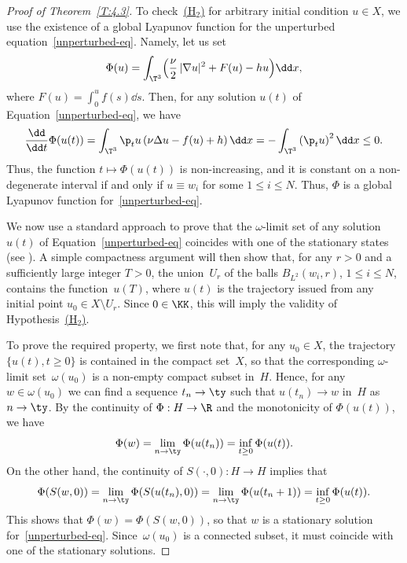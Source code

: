 \begin{proof}[Proof of Theorem~\ref{T:4.3}]
To check~\hyperlink{H2}{(H$_2$)} for arbitrary initial condition $u\in X$, we use the existence of a global Lyapunov function for the unperturbed equation~\eqref{unperturbed-eq}. Namely, let us set
\begin{equation}\label{E:4.5}
\Phi(u)=\int_{\T^3} \Bigl(\frac\nu2\,|\nabla u|^2+F(u)-hu\Bigr)\dd x,
\end{equation}
where $F(u)=\int_0^uf(s)\dd s$. Then, for any solution $u(t)$ of Equation~\eqref{unperturbed-eq}, we have
\[
\frac{\dd}{\dd t} \Phi(u(t))=\int_{\T^3} \p_tu\left(\nu \Delta u- f(u)+h \right)\dd x=-\int_{\T^3} \left(\p_tu\right)^2\dd x\le 0.
\]
Thus, the function $t\mapsto \Phi(u(t))$ is non-increasing, and it is constant on a non-degenerate interval if and only if $u\equiv w_i$ for some $1\le i\le N$. Thus, $\varPhi$ is a global Lyapunov function for~\eqref{unperturbed-eq}.

We now use a standard approach to prove that the $\omega$-limit set of any solution~$u(t)$ of Equation~\eqref{unperturbed-eq} coincides with one of the stationary states (\eg see \cite[Chap.\,3,\,\S2]{BV1992}). A simple compactness argument will then show that, for any $r>0$ and a sufficiently large integer $T>0$, the union~$U_r$ of the balls $B_{L^2}(w_i,r)$, $1\le i\le N$, contains the function~$u(T)$, where $u(t)$ is the trajectory issued from any initial point $u_0\in X\setminus U_r$. Since $0\in \KK$, this will imply the validity of Hypothesis~\hyperlink{H2}{(H$_2$)}.

To prove the required property, we first note that, for any $u_0\in X$, the trajectory $\{u(t), t\ge0\}$ is contained in the compact set~$X$, so that the corresponding $\omega$-limit set~$\omega(u_0)$ is a non-empty compact subset in~$H$. Hence, for any $w\in \omega(u_0)$ we can find a sequence $t_n\to \ty$ such that $u(t_n)\to w$ in~$H$ as $n\to\ty$. By the continuity of $\Phi: H\to \R$ and the monotonicity of $\Phi(u(t))$, we have
\[
\Phi(w)=\lim_{n\to \ty}\Phi(u(t_n))= \inf_{t\ge0} \Phi(u(t)).
\]
On the other hand, the continuity of $S(\cdot,0):H\to H$ implies that
\[
\Phi(S(w,0))=\lim_{n\to \ty}\Phi(S(u(t_n),0))=\lim_{n\to \ty}\Phi(u(t_n+1))=\inf_{t\ge0} \Phi(u(t)).
\]
This shows that $\Phi(w)=\Phi(S(w,0))$, so that $w$ is a stationary solution for~\eqref{unperturbed-eq}. Since~$\omega(u_0)$ is a connected subset, it must coincide with one of the stationary solutions.


\end{proof}

